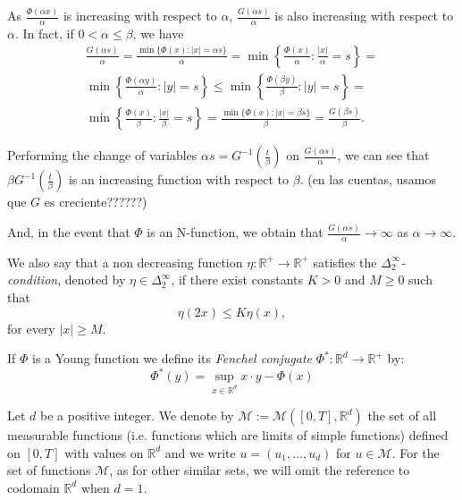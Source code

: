 \documentclass[twoside]{article}
\theoremstyle{remark}
\newcommand{\rr}{\mathbb{R}}
\renewcommand{\leq}{\leqslant}
\renewcommand{\geq}{\geqslant}
\begin{document}
As $\frac{\Phi(\alpha x)}{\alpha}$ is increasing with respect to $\alpha$, 
$\frac{G(\alpha s)}{\alpha}$ is also increasing 
with respect to $\alpha$.
In fact, 
if $0<\alpha \leq \beta$, we have
\[
\begin{split}
 \frac{G(\alpha s)}{\alpha}=
\frac{\min\{\Phi(x):|x|=\alpha s\}}{\alpha}=
\min 
\left\{\frac{\Phi(x)}{\alpha}:\frac{|x|}{\alpha}=s \right\}=
\\
\min\left\{\frac{\Phi(\alpha y)}{\alpha}:|y|=s \right\}
\leq \min \left\{\frac{\Phi(\beta y)}{\beta}: |y|=s \right\}=
\\
\min \left\{ \frac{\Phi(x)}{\beta}: \frac{|x|}{\beta}=s\right\}=
\frac{\min\{\Phi(x): |x|=\beta s\}}{\beta}=
\frac{G(\beta s)}{\beta}.
\end{split}
\]



Performing the change of variables $\alpha s=G^{-1}(\frac{t}{\beta})$ on $\frac{G(\alpha s)}{\alpha}$, 
we can see that $\beta G^{-1}(\frac{t}{\beta})$ is an increasing function with respect to 
$\beta$. {\color{red}(en las cuentas, usamos que $G$ es creciente??????)}

And, in the event that $\Phi$ is an N-function, we obtain that $\frac{G(\alpha s)}{\alpha}\to \infty$
as $\alpha \to \infty$.







We also say that a non decreasing function $\eta:\mathbb{R}^+\rightarrow \mathbb{R}^+$ satisfies the  \emph{$\Delta_2^{\infty}$-condition}, denoted by $\eta \in \Delta_2^{\infty}$,
if there exist  constants $K>0$ and  $M\geq 0$ such that
\begin{equation}\label{delta2defi}\eta(2x)\leq K\eta(x),
\end{equation}
for every $|x|\geq M$.

If $\Phi$ is a Young function we define its \emph{Fenchel conjugate}   $\Phi^*:\mathbb{R}^d\to \mathbb{R}^+ $ by:
\begin{equation}\label{eq:conjugada}
 \Phi^*(y)=\sup\limits_{x\in\mathbb{R}^d} x\cdot y-\Phi(x)
\end{equation}


Let $d$ be a positive integer. We denote by $\mathcal{M}:=\mathcal{M}([0,T],\rr^d)$  the set of all measurable functions (i.e. functions which are limits of simple functions)  defined on $[0,T]$ with values on $\mathbb{R}^d$ and  we write $u=(u_1,\dots,u_d)$ for  $u\in \mathcal{M}$. For the set of functions $\mathcal{M}$, as for other similar sets, we will omit the reference to codomain $\mathbb{R}^d$ when $d=1$.
\end{document}
